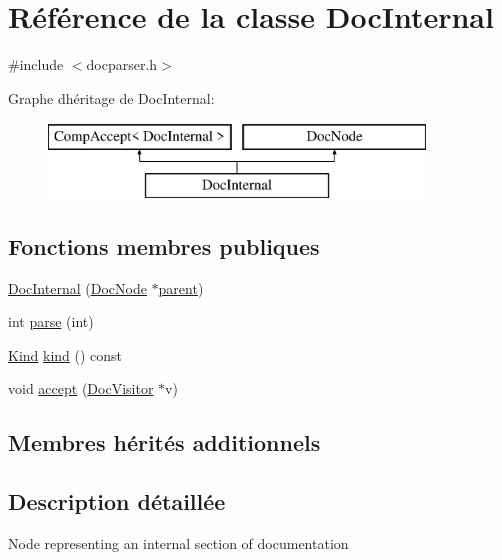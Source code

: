 \hypertarget{class_doc_internal}{}\section{Référence de la classe Doc\+Internal}
\label{class_doc_internal}


{\ttfamily \#include $<$docparser.\+h$>$}

Graphe d\textquotesingle{}héritage de Doc\+Internal\+:\begin{figure}[H]
\begin{center}
\leavevmode
\includegraphics[height=2.000000cm]{class_doc_internal}
\end{center}
\end{figure}
\subsection*{Fonctions membres publiques}
\begin{DoxyCompactItemize}
\item 
\hyperlink{class_doc_internal_aaf39e5b4e9c6aeef48f90e51ef94b342}{Doc\+Internal} (\hyperlink{class_doc_node}{Doc\+Node} $\ast$\hyperlink{class_doc_node_a990d8b983962776a647e6231d38bd329}{parent})
\item 
int \hyperlink{class_doc_internal_ab88dfb2d7c445158de27b3738358a92d}{parse} (int)
\item 
\hyperlink{class_doc_node_aebd16e89ca590d84cbd40543ea5faadb}{Kind} \hyperlink{class_doc_internal_a19b3cc051342dca36f64b7d7807d6d2b}{kind} () const 
\item 
void \hyperlink{class_doc_internal_a5bc31645d59f7a949298fe2d9bd8f976}{accept} (\hyperlink{class_doc_visitor}{Doc\+Visitor} $\ast$v)
\end{DoxyCompactItemize}
\subsection*{Membres hérités additionnels}


\subsection{Description détaillée}
Node representing an internal section of documentation 

